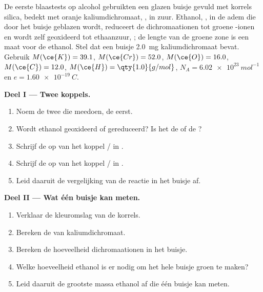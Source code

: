 \begin{problem}
\label{pb:g11:redox:1}
De eerste blaastests op alcohol gebruikten een glazen buisje gevuld met
korrels silica, bedekt met oranje kaliumdichromaat, , in
zuur. Ethanol, , in de adem die door het buisje geblazen
wordt, reduceert de dichromaationen tot groene -ionen en
wordt zelf geoxideerd tot ethaanzuur, ; de lengte van de
groene zone is een maat voor de ethanol. Stel dat een buisje
\qty{2.0}{mg} kaliumdichromaat bevat. Gebruik
$M(\ce{K}) = 39.1$, $M(\ce{Cr}) = 52.0$, $M(\ce{O}) = 16.0$,
$M(\ce{C}) = 12.0$, $M(\ce{H}) = \qty{1.0}{g/mol}$, $N_A =
\qty{6.02e23}{mol^{-1}}$ en $e = \qty{1.60e-19}{C}$.

\medskip
\noindent\textbf{Deel I --- Twee koppels.}
\begin{enumerate}
  \item Noem de twee  die meedoen, de  eerst.
  \item Wordt ethanol geoxideerd of gereduceerd? Is het de  of de
        ?
  \item Schrijf de  op van het koppel
        / in .
  \item Schrijf de  op van het koppel
        / in .
  \item Leid daaruit de vergelijking van de reactie in het buisje af.
\end{enumerate}

\medskip
\noindent\textbf{Deel II --- Wat één buisje kan meten.}
\begin{enumerate}[resume]
  \item Verklaar de kleuromslag van de korrels.
  \item Bereken de  van kaliumdichromaat.
  \item Bereken de hoeveelheid dichromaationen in het buisje.
  \item Welke hoeveelheid ethanol is er nodig om het hele buisje groen te
        maken?
  \item Leid daaruit de grootste massa ethanol af die één buisje kan
        meten.
\end{enumerate}


\end{problem}
